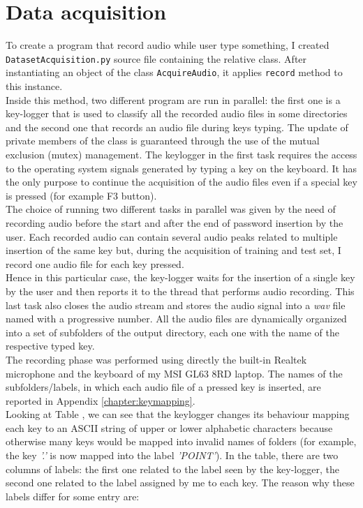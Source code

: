 \section{Data acquisition}
To create a program that record audio while user type something, I created \texttt{DatasetAcquisition.py} source file containing the relative class. After instantiating an object of the class \texttt{AcquireAudio}, it applies \texttt{record} method to this instance.\\
Inside this method, two different program are run in parallel: the first one is a key-logger that is used to classify all the recorded audio files in some directories and the second one that records an audio file during keys typing. The update of private members of the class is guaranteed through the use of the mutual exclusion (mutex) management. The keylogger in the first task requires the access to the operating system signals generated by typing a key on the keyboard. It has the only purpose to continue the acquisition of the audio files even if a special key is pressed (for example F3 button).\\
The choice of running two different tasks in parallel was given by the need of recording audio before the start and after the end of password insertion by the user. Each recorded audio can contain several audio peaks related to multiple insertion of the same key but, during the acquisition of training and test set, I record one audio file for each key pressed.\\
Hence in this particular case, the key-logger waits for the insertion of a single key by the user and then reports it to the thread that performs audio recording. This last task also closes the audio stream and stores the audio signal into a \textit{wav} file named with a progressive number. All the audio files are dynamically organized into a set of subfolders of the output directory, each one with the name of the respective typed key.\\
The recording phase was performed using directly the built-in Realtek microphone and the keyboard of my MSI GL63 8RD laptop. The names of the subfolders/labels, in which each audio file of a pressed key is inserted, are reported in Appendix \ref{chapter:keymapping}.\\
Looking at Table , we can see that the keylogger changes its behaviour mapping each key to an ASCII string of upper or lower alphabetic characters because otherwise many keys would be mapped into invalid names of folders (for example, the key \textit{'.'} is now mapped into the label \textit{'POINT'}). In the table, there are two columns of labels: the first one related to the label seen by the key-logger, the second one related to the label assigned by me to each key. The reason why these labels differ for some entry are:
